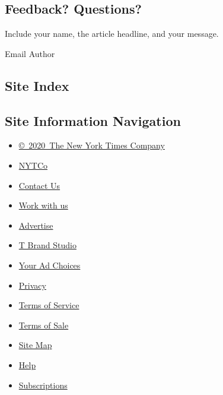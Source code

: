 \hypertarget{feedback-questions}{%
\subsection{Feedback? Questions?}\label{feedback-questions}}

Include your name, the article headline, and your message.

Email Author

\hypertarget{site-index}{%
\subsection{Site Index}\label{site-index}}

\hypertarget{site-information-navigation}{%
\subsection{Site Information
Navigation}\label{site-information-navigation}}

\begin{itemize}
\tightlist
\item
  \href{https://help.nytimes3xbfgragh.onion/hc/en-us/articles/115014792127-Copyright-notice}{©~2020~The
  New York Times Company}
\end{itemize}

\begin{itemize}
\tightlist
\item
  \href{https://www.nytco.com/}{NYTCo}
\item
  \href{https://help.nytimes3xbfgragh.onion/hc/en-us/articles/115015385887-Contact-Us}{Contact
  Us}
\item
  \href{https://www.nytco.com/careers/}{Work with us}
\item
  \href{https://nytmediakit.com/}{Advertise}
\item
  \href{http://www.tbrandstudio.com/}{T Brand Studio}
\item
  \href{https://www.nytimes3xbfgragh.onion/privacy/cookie-policy\#how-do-i-manage-trackers}{Your
  Ad Choices}
\item
  \href{https://www.nytimes3xbfgragh.onion/privacy}{Privacy}
\item
  \href{https://help.nytimes3xbfgragh.onion/hc/en-us/articles/115014893428-Terms-of-service}{Terms
  of Service}
\item
  \href{https://help.nytimes3xbfgragh.onion/hc/en-us/articles/115014893968-Terms-of-sale}{Terms
  of Sale}
\item
  \href{https://spiderbites.nytimes3xbfgragh.onion}{Site Map}
\item
  \href{https://help.nytimes3xbfgragh.onion/hc/en-us}{Help}
\item
  \href{https://www.nytimes3xbfgragh.onion/subscription?campaignId=37WXW}{Subscriptions}
\end{itemize}

